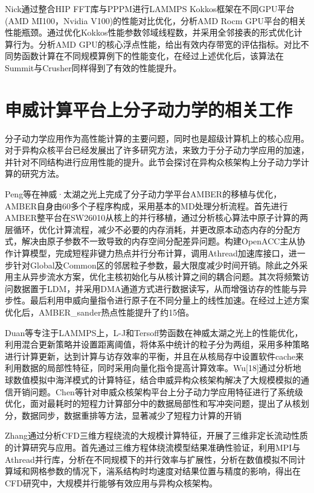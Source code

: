 Nick\cite{hagerty2022studying}通过整合HIP FFT库与PPPM进行LAMMPS Kokkos框架在不同GPU平台(AMD MI100，Nvidia V100)的性能对比优化，分析AMD Rocm GPU平台的相关性能瓶颈。通过优化Kokkos性能参数邻域线程数，并采用全邻接表的形式优化计算行为。分析AMD GPU的核心浮点性能，给出有效内存带宽的评估指标。对比不同势函数计算在不同规模算例下的性能变化，在经过上述优化后，该算法在Summit与Crusher同样得到了有效的性能提升。

\section{申威计算平台上分子动力学的相关工作}
分子动力学应用作为高性能计算的主要问题，同时也是超级计算机上的核心应用。对于异构众核平台已经发展出了许多研究方法，来致力于分子动力学应用的加速，并针对不同结构进行应用性能的提升。此节会探讨在异构众核架构上分子动力学计算的研究方法。

Peng\cite{peng2020}等在神威·太湖之光上完成了分子动力学平台AMBER的移植与优化，AMBER自身由60多个子程序构成，采用基本的MD处理分析流程。首先进行AMBER整平台在SW26010从核上的并行移植，通过分析核心算法中原子计算的两层循环，优化计算流程，减少不必要的内存消耗，并更改原本动态内存的分配方式，解决由原子参数不一致导致的内存空间分配差异问题。构建OpenACC主从协作计算模型，完成短程非键力热点并行分布计算，调用Athread加速库接口，进一步针对Global及Common区的邻居粒子参数，最大限度减少时间开销。除此之外采用主从异步流水方案，优化主核初始化与从核计算之间的耦合问题。其次将频繁访问数据置于LDM，并采用DMA通道方式进行数据读写，从而增强访存的性能与异步性。最后利用申威向量指令进行原子在不同分量上的线性加速。在经过上述方案优化后，AMBER\_sander热点性能提升了约15倍。

Duan\cite{duan2018redesigning}等专注于LAMMPS上，L-J和Tersoff势函数在神威太湖之光上的性能优化，利用混合更新策略并设置距离阈值，将体系中统计的粒子分为两组，采用多种策略进行计算更新，达到计算与访存效率的平衡，并且在从核局存中设置软件cache来利用数据的局部性特征，同时采用向量化指令提高计算效率。Wu[18]通过分析地球数值模拟中海洋模式的计算特征，结合申威异构众核架构解决了大规模模拟的通信开销问题。Chen\cite{chen2021towards}等针对申威众核架构平台上分子动力学应用特征进行了系统级优化，面对最耗时的短程力计算部分中的数据局部性和写冲突问题，提出了从核划分，数据同步，数据重排等方法，显著减少了短程力计算的开销

Zhang\cite{zyy2022}通过分析CFD三维方程绕流的大规模计算特征，开展了三维非定长流动性质的计算研究与应用。首先通过三维方程体绕流模型结果准确性验证，利用MPI与Athread并行库，分析在不同规模下的并行效率与扩展性，分析在数值模拟不同计算域和网格参数的情况下，湍系结构时均速度对结果位置与精度的影响，得出在CFD研究中，大规模并行能够有效应用与异构众核架构。

